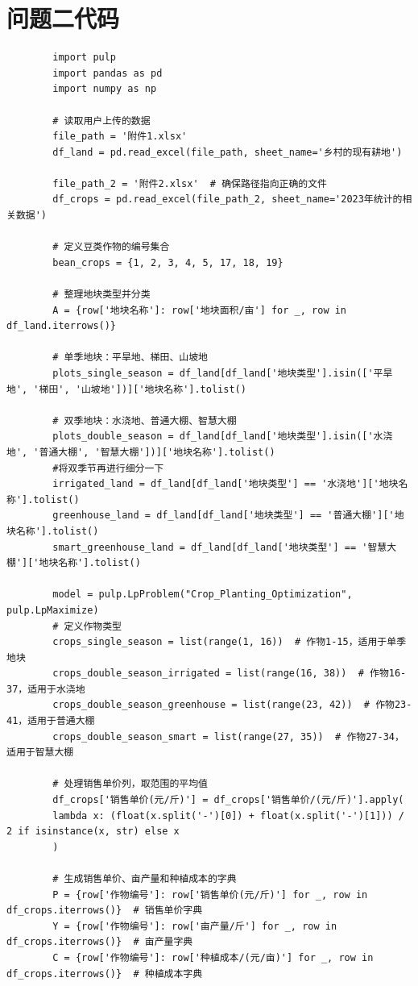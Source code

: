 \documentclass[12pt]{ctexart}
\begin{document}
	\section{问题二代码}
	\begin{verbatim}
		import pulp
		import pandas as pd
		import numpy as np
		
		# 读取用户上传的数据
		file_path = '附件1.xlsx'
		df_land = pd.read_excel(file_path, sheet_name='乡村的现有耕地')
		
		file_path_2 = '附件2.xlsx'  # 确保路径指向正确的文件
		df_crops = pd.read_excel(file_path_2, sheet_name='2023年统计的相关数据')
		
		# 定义豆类作物的编号集合
		bean_crops = {1, 2, 3, 4, 5, 17, 18, 19}
		
		# 整理地块类型并分类
		A = {row['地块名称']: row['地块面积/亩'] for _, row in df_land.iterrows()}
		
		# 单季地块：平旱地、梯田、山坡地
		plots_single_season = df_land[df_land['地块类型'].isin(['平旱地', '梯田', '山坡地'])]['地块名称'].tolist()
		
		# 双季地块：水浇地、普通大棚、智慧大棚
		plots_double_season = df_land[df_land['地块类型'].isin(['水浇地', '普通大棚', '智慧大棚'])]['地块名称'].tolist()
		#将双季节再进行细分一下
		irrigated_land = df_land[df_land['地块类型'] == '水浇地']['地块名称'].tolist()
		greenhouse_land = df_land[df_land['地块类型'] == '普通大棚']['地块名称'].tolist()
		smart_greenhouse_land = df_land[df_land['地块类型'] == '智慧大棚']['地块名称'].tolist()
		
		model = pulp.LpProblem("Crop_Planting_Optimization", pulp.LpMaximize)
		# 定义作物类型
		crops_single_season = list(range(1, 16))  # 作物1-15，适用于单季地块
		crops_double_season_irrigated = list(range(16, 38))  # 作物16-37，适用于水浇地
		crops_double_season_greenhouse = list(range(23, 42))  # 作物23-41，适用于普通大棚
		crops_double_season_smart = list(range(27, 35))  # 作物27-34，适用于智慧大棚
		
		# 处理销售单价列，取范围的平均值
		df_crops['销售单价(元/斤)'] = df_crops['销售单价/(元/斤)'].apply(
		lambda x: (float(x.split('-')[0]) + float(x.split('-')[1])) / 2 if isinstance(x, str) else x
		)
		
		# 生成销售单价、亩产量和种植成本的字典
		P = {row['作物编号']: row['销售单价(元/斤)'] for _, row in df_crops.iterrows()}  # 销售单价字典
		Y = {row['作物编号']: row['亩产量/斤'] for _, row in df_crops.iterrows()}  # 亩产量字典
		C = {row['作物编号']: row['种植成本/(元/亩)'] for _, row in df_crops.iterrows()}  # 种植成本字典
		

\end{verbatim}
\end{document}
